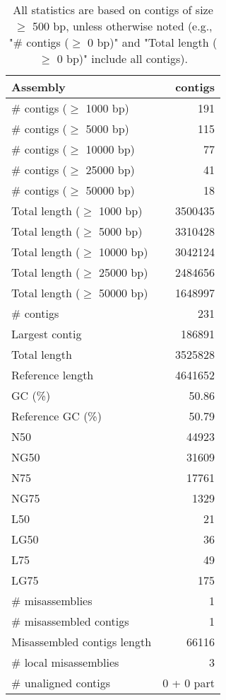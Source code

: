 \documentclass[12pt,a4paper]{article}
\begin{document}
\begin{table}[ht]
\begin{center}
\caption{All statistics are based on contigs of size $\geq$ 500 bp, unless otherwise noted (e.g., "\# contigs ($\geq$ 0 bp)" and "Total length ($\geq$ 0 bp)" include all contigs).}
\begin{tabular}{|l*{1}{|r}|}
\hline
Assembly & contigs \\ \hline
\# contigs ($\geq$ 1000 bp) & 191 \\ \hline
\# contigs ($\geq$ 5000 bp) & 115 \\ \hline
\# contigs ($\geq$ 10000 bp) & 77 \\ \hline
\# contigs ($\geq$ 25000 bp) & 41 \\ \hline
\# contigs ($\geq$ 50000 bp) & 18 \\ \hline
Total length ($\geq$ 1000 bp) & 3500435 \\ \hline
Total length ($\geq$ 5000 bp) & 3310428 \\ \hline
Total length ($\geq$ 10000 bp) & 3042124 \\ \hline
Total length ($\geq$ 25000 bp) & 2484656 \\ \hline
Total length ($\geq$ 50000 bp) & 1648997 \\ \hline
\# contigs & 231 \\ \hline
Largest contig & 186891 \\ \hline
Total length & 3525828 \\ \hline
Reference length & 4641652 \\ \hline
GC (\%) & 50.86 \\ \hline
Reference GC (\%) & 50.79 \\ \hline
N50 & 44923 \\ \hline
NG50 & 31609 \\ \hline
N75 & 17761 \\ \hline
NG75 & 1329 \\ \hline
L50 & 21 \\ \hline
LG50 & 36 \\ \hline
L75 & 49 \\ \hline
LG75 & 175 \\ \hline
\# misassemblies & 1 \\ \hline
\# misassembled contigs & 1 \\ \hline
Misassembled contigs length & 66116 \\ \hline
\# local misassemblies & 3 \\ \hline
\# unaligned contigs & 0 + 0 part \\ \hline

\end{tabular}
\end{center}
\end{table}
\end{document}

